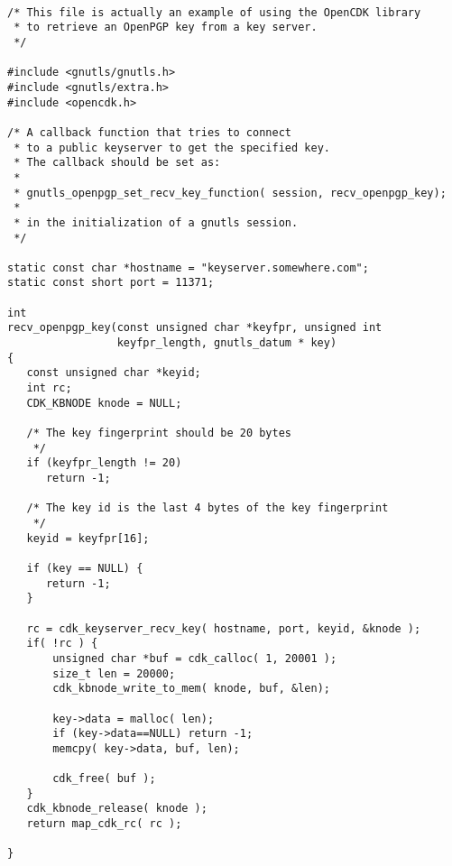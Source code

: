 \begin {verbatim}

/* This file is actually an example of using the OpenCDK library
 * to retrieve an OpenPGP key from a key server.
 */

#include <gnutls/gnutls.h>
#include <gnutls/extra.h>
#include <opencdk.h>

/* A callback function that tries to connect
 * to a public keyserver to get the specified key.
 * The callback should be set as:
 *
 * gnutls_openpgp_set_recv_key_function( session, recv_openpgp_key);
 *
 * in the initialization of a gnutls session.
 */

static const char *hostname = "keyserver.somewhere.com";
static const short port = 11371;

int
recv_openpgp_key(const unsigned char *keyfpr, unsigned int
                 keyfpr_length, gnutls_datum * key)
{
   const unsigned char *keyid;
   int rc;
   CDK_KBNODE knode = NULL;

   /* The key fingerprint should be 20 bytes
    */
   if (keyfpr_length != 20)
      return -1;

   /* The key id is the last 4 bytes of the key fingerprint
    */
   keyid = keyfpr[16];

   if (key == NULL) {
      return -1;
   }

   rc = cdk_keyserver_recv_key( hostname, port, keyid, &knode );
   if( !rc ) {
       unsigned char *buf = cdk_calloc( 1, 20001 );
       size_t len = 20000;
       cdk_kbnode_write_to_mem( knode, buf, &len);

       key->data = malloc( len);
       if (key->data==NULL) return -1;
       memcpy( key->data, buf, len);

       cdk_free( buf );
   }
   cdk_kbnode_release( knode );
   return map_cdk_rc( rc );

}


\end{verbatim}
